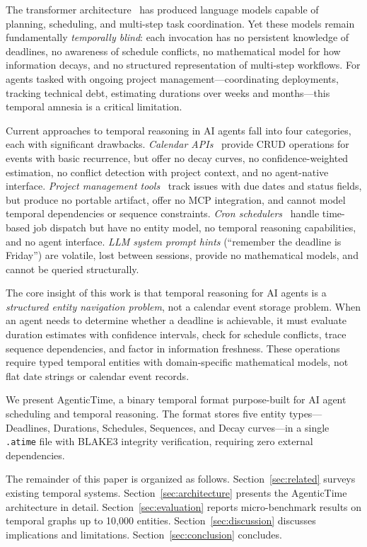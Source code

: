 \documentclass[10pt, twocolumn]{article}
\begin{document}
The transformer architecture~\cite{vaswani2017attention} has produced language models capable of planning, scheduling, and multi-step task coordination. Yet these models remain fundamentally \emph{temporally blind}: each invocation has no persistent knowledge of deadlines, no awareness of schedule conflicts, no mathematical model for how information decays, and no structured representation of multi-step workflows. For agents tasked with ongoing project management---coordinating deployments, tracking technical debt, estimating durations over weeks and months---this temporal amnesia is a critical limitation.

Current approaches to temporal reasoning in AI agents fall into four categories, each with significant drawbacks. \emph{Calendar APIs}~\cite{google_calendar_api, ical_rfc5545} provide CRUD operations for events with basic recurrence, but offer no decay curves, no confidence-weighted estimation, no conflict detection with project context, and no agent-native interface. \emph{Project management tools}~\cite{jira_2024, linear_2024} track issues with due dates and status fields, but produce no portable artifact, offer no MCP integration, and cannot model temporal dependencies or sequence constraints. \emph{Cron schedulers}~\cite{cron_ieee} handle time-based job dispatch but have no entity model, no temporal reasoning capabilities, and no agent interface. \emph{LLM system prompt hints} (``remember the deadline is Friday'') are volatile, lost between sessions, provide no mathematical models, and cannot be queried structurally.

The core insight of this work is that temporal reasoning for AI agents is a \emph{structured entity navigation problem}, not a calendar event storage problem. When an agent needs to determine whether a deadline is achievable, it must evaluate duration estimates with confidence intervals, check for schedule conflicts, trace sequence dependencies, and factor in information freshness. These operations require typed temporal entities with domain-specific mathematical models, not flat date strings or calendar event records.

We present AgenticTime, a binary temporal format purpose-built for AI agent scheduling and temporal reasoning. The format stores five entity types---Deadlines, Durations, Schedules, Sequences, and Decay curves---in a single \texttt{.atime} file with BLAKE3 integrity verification, requiring zero external dependencies.

The remainder of this paper is organized as follows. Section~\ref{sec:related} surveys existing temporal systems. Section~\ref{sec:architecture} presents the AgenticTime architecture in detail. Section~\ref{sec:evaluation} reports micro-benchmark results on temporal graphs up to 10{,}000 entities. Section~\ref{sec:discussion} discusses implications and limitations. Section~\ref{sec:conclusion} concludes.
\end{document}
